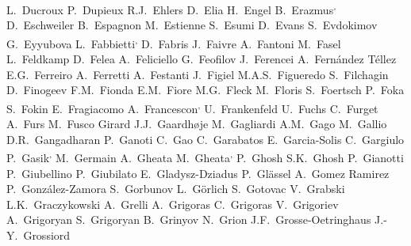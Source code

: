 \begin{flushleft}
L.~Ducroux\And
P.~Dupieux\And
R.J.~Ehlers\And
D.~Elia\And
H.~Engel\And
B.~Erazmus\textsuperscript{,}\And
D.~Eschweiler\And
B.~Espagnon\And
M.~Estienne\And
S.~Esumi\And
D.~Evans\And
S.~Evdokimov\And
G.~Eyyubova\And
L.~Fabbietti\textsuperscript{,}\And
D.~Fabris\And
J.~Faivre\And
A.~Fantoni\And
M.~Fasel\And
L.~Feldkamp\And
D.~Felea\And
A.~Feliciello\And
G.~Feofilov\And
J.~Ferencei\And
A.~Fern\'{a}ndez T\'{e}llez\And
E.G.~Ferreiro\And
A.~Ferretti\And
A.~Festanti\And
J.~Figiel\And
M.A.S.~Figueredo\And
S.~Filchagin\And
D.~Finogeev\And
F.M.~Fionda\And
E.M.~Fiore\And
M.G.~Fleck\And
M.~Floris\And
S.~Foertsch\And
P.~Foka\And
S.~Fokin\And
E.~Fragiacomo\And
A.~Francescon\textsuperscript{,}\And
U.~Frankenfeld\And
U.~Fuchs\And
C.~Furget\And
A.~Furs\And
M.~Fusco Girard\And
J.J.~Gaardh{\o}je\And
M.~Gagliardi\And
A.M.~Gago\And
M.~Gallio\And
D.R.~Gangadharan\And
P.~Ganoti\And
C.~Gao\And
C.~Garabatos\And
E.~Garcia-Solis\And
C.~Gargiulo\And
P.~Gasik\textsuperscript{,}\And
M.~Germain\And
A.~Gheata\And
M.~Gheata\textsuperscript{,}\And
P.~Ghosh\And
S.K.~Ghosh\And
P.~Gianotti\And
P.~Giubellino\And
P.~Giubilato\And
E.~Gladysz-Dziadus\And
P.~Gl\"{a}ssel\And
A.~Gomez Ramirez\And
P.~Gonz\'{a}lez-Zamora\And
S.~Gorbunov\And
L.~G\"{o}rlich\And
S.~Gotovac\And
V.~Grabski\And
L.K.~Graczykowski\And
A.~Grelli\And
A.~Grigoras\And
C.~Grigoras\And
V.~Grigoriev\And
A.~Grigoryan\And
S.~Grigoryan\And
B.~Grinyov\And
N.~Grion\And
J.F.~Grosse-Oetringhaus\And
J.-Y.~Grossiord\And

\end{flushleft}
